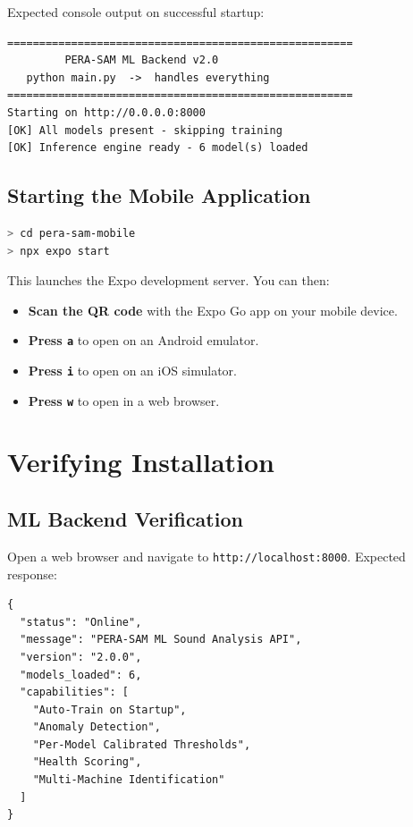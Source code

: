 \documentclass[10pt, a4paper, oneside]{report}
\begin{document}
Expected console output on successful startup:
\begin{lstlisting}[caption={Successful startup output}]
======================================================
         PERA-SAM ML Backend v2.0
   python main.py  ->  handles everything
======================================================
Starting on http://0.0.0.0:8000
[OK] All models present - skipping training
[OK] Inference engine ready - 6 model(s) loaded
\end{lstlisting}

\subsection{Starting the Mobile Application}

\begin{lstlisting}[language=bash, caption={Start mobile application}]
> cd pera-sam-mobile
> npx expo start
\end{lstlisting}

This launches the Expo development server. You can then:
\begin{itemize}[leftmargin=*, nosep]
  \item \textbf{Scan the QR code} with the Expo Go app on your mobile device.
  \item \textbf{Press \texttt{a}} to open on an Android emulator.
  \item \textbf{Press \texttt{i}} to open on an iOS simulator.
  \item \textbf{Press \texttt{w}} to open in a web browser.
\end{itemize}

\section{Verifying Installation}
\label{sec:verify}

\subsection{ML Backend Verification}

Open a web browser and navigate to \texttt{http://localhost:8000}. Expected response:

\begin{lstlisting}[caption={API Status Response}]
{
  "status": "Online",
  "message": "PERA-SAM ML Sound Analysis API",
  "version": "2.0.0",
  "models_loaded": 6,
  "capabilities": [
    "Auto-Train on Startup",
    "Anomaly Detection",
    "Per-Model Calibrated Thresholds",
    "Health Scoring",
    "Multi-Machine Identification"
  ]
}
\end{lstlisting}
\end{document}
